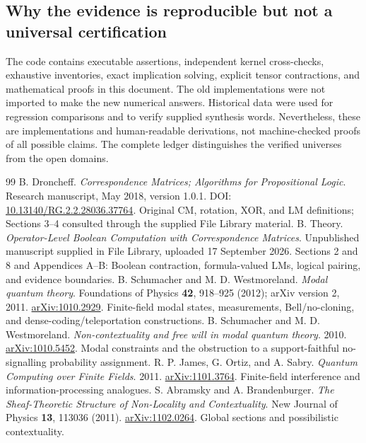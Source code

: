 \documentclass[11pt,a4paper]{article}
\theoremstyle{definition}\newtheorem{definition}[theorem]{Definition}
\begin{document}
\subsection{Why the evidence is reproducible but not a universal certification}
The code contains executable assertions, independent kernel cross-checks, exhaustive inventories, exact implication solving, explicit tensor contractions, and mathematical proofs in this document. The old implementations were not imported to make the new numerical answers. Historical data were used for regression comparisons and to verify supplied synthesis words. Nevertheless, these are implementations and human-readable derivations, not machine-checked proofs of all possible claims. The complete ledger distinguishes the verified universes from the open domains.

\begin{thebibliography}{99}
 B. Droncheff. \emph{Correspondence Matrices; Algorithms for Propositional Logic}. Research manuscript, May 2018, version 1.0.1. DOI: \href{https://doi.org/10.13140/RG.2.2.28036.37764}{10.13140/RG.2.2.28036.37764}. Original CM, rotation, XOR, and LM definitions; Sections 3--4 consulted through the supplied File Library material.
 B. Theory. \emph{Operator-Level Boolean Computation with Correspondence Matrices}. Unpublished manuscript supplied in File Library, uploaded 17 September 2026. Sections 2 and 8 and Appendices A--B: Boolean contraction, formula-valued LMs, logical pairing, and evidence boundaries.
 B. Schumacher and M. D. Westmoreland. \emph{Modal quantum theory}. Foundations of Physics \textbf{42}, 918--925 (2012); arXiv version 2, 2011. \href{https://arxiv.org/abs/1010.2929}{arXiv:1010.2929}. Finite-field modal states, measurements, Bell/no-cloning, and dense-coding/teleportation constructions.
 B. Schumacher and M. D. Westmoreland. \emph{Non-contextuality and free will in modal quantum theory}. 2010. \href{https://arxiv.org/abs/1010.5452}{arXiv:1010.5452}. Modal constraints and the obstruction to a support-faithful no-signalling probability assignment.
 R. P. James, G. Ortiz, and A. Sabry. \emph{Quantum Computing over Finite Fields}. 2011. \href{https://arxiv.org/abs/1101.3764}{arXiv:1101.3764}. Finite-field interference and information-processing analogues.
 S. Abramsky and A. Brandenburger. \emph{The Sheaf-Theoretic Structure of Non-Locality and Contextuality}. New Journal of Physics \textbf{13}, 113036 (2011). \href{https://arxiv.org/abs/1102.0264}{arXiv:1102.0264}. Global sections and possibilistic contextuality.

\end{thebibliography}
\end{document}
